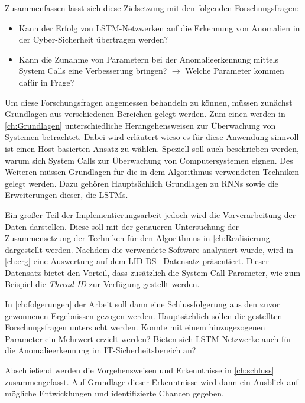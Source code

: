 Zusammenfassen lässt sich diese Zielsetzung mit den folgenden Forschungsfragen:
\begin{itemize}
    \item Kann der Erfolg von LSTM-Netzwerken auf die Erkennung von Anomalien in der Cyber-Sicherheit übertragen werden?
    \item Kann die Zunahme von Parametern bei der Anomalieerkennung mittels System Calls eine Verbesserung bringen?
        $\rightarrow$ Welche Parameter kommen dafür in Frage?
\end{itemize}

Um diese Forschungsfragen angemessen behandeln zu können, müssen zunächst Grundlagen aus verschiedenen Bereichen gelegt werden.
Zum einen werden in \autoref{ch:Grundlagen} unterschiedliche Herangehensweisen zur Überwachung von Systemen betrachtet.
Dabei wird erläutert wieso es für diese Anwendung sinnvoll ist einen Host-basierten Ansatz zu wählen.
Speziell soll auch beschrieben werden, warum sich System Calls zur Überwachung von Computersystemen eignen.
Des Weiteren müssen Grundlagen für die in dem Algorithmus verwendeten Techniken gelegt werden.
Dazu gehören Hauptsächlich Grundlagen zu \acp{RNN} sowie die Erweiterungen dieser, die \acp{LSTM}.

Ein großer Teil der Implementierungsarbeit jedoch wird die Vorverarbeitung der Daten darstellen.
Diese soll mit der genaueren Untersuchung der Zusammensetzung der Techniken für den Algorithmus in \autoref{ch:Realisierung} dargestellt werden.
Nachdem die verwendete Software analysiert wurde, wird in \autoref{ch:erg} eine Auswertung auf dem LID-DS~\cite{LID-DS} Datensatz präsentiert.
Dieser Datensatz bietet den Vorteil, dass zusätzlich die System Call Parameter, wie zum Beispiel die \textit{Thread ID} zur Verfügung gestellt werden.

In \autoref{ch:folgerungen} der Arbeit soll dann eine Schlussfolgerung aus den zuvor gewonnenen Ergebnissen gezogen werden. 
Hauptsächlich sollen die gestellten Forschungsfragen untersucht werden.
Konnte mit einem hinzugezogenen Parameter ein Mehrwert erzielt werden?
Bieten sich LSTM-Netzwerke auch für die Anomalieerkennung im IT-Sicherheitsbereich an?

Abschließend werden die Vorgehensweisen und Erkenntnisse in \autoref{ch:schluss} zusammengefasst.
Auf Grundlage dieser Erkenntnisse wird dann ein Ausblick auf mögliche Entwicklungen und identifizierte Chancen gegeben. 

